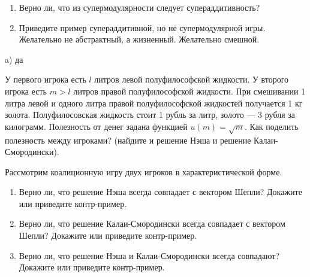 \begin{problem}

\begin{enumerate}
\item Верно ли, что из супермодулярности следует супераддитивность?

\item Приведите пример супераддитивной, но не супермодулярной игры. Желательно не абстрактный, а жизненный. Желательно смешной.
\end{enumerate}


\begin{sol}
\begin{enumerate}
a) да
\end{enumerate}
\end{sol}
\end{problem}





\begin{problem}
 У первого игрока есть $l$ литров левой полуфилософской
жидкости. У второго игрока есть $m>l$ литров правой полуфилософской
жидкости. При смешивании 1 литра левой и одного литра правой полуфилософской
жидкостей получается 1 кг золота. Полуфилосовская жидкость стоит 1
рубль за литр, золото --- 3 рубля за килограмм. Полезность от денег
задана функцией $u(m)=\sqrt{m}$. Как поделить полезность между игроками?
(найдите и решение Нэша и решение Калаи-Смородински).



\begin{sol}

\end{sol}
\end{problem}



\begin{problem}

 Рассмотрим коалиционную игру двух игроков в характеристической
форме.

\begin{enumerate}
\item Верно ли, что решение Нэша всегда совпадает с вектором Шепли? Докажите
или приведите контр-пример.

\item Верно ли, что решение Калаи-Смородински всегда совпадает с вектором
Шепли? Докажите или приведите контр-пример.

\item Верно ли, что решение Нэша и Калаи-Смородински всегда совпадают? Докажите
или приведите контр-пример.
\end{enumerate}



\begin{sol}

\end{sol}
\end{problem}



